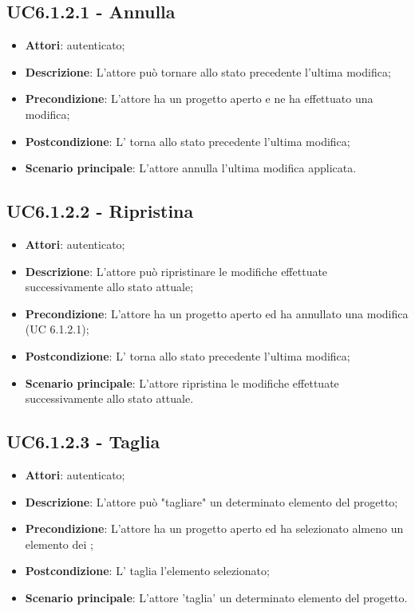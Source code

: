 \subsection{UC6.1.2.1 - Annulla}
\label{ssec:UC6.1.2.1}
\begin{itemize}
\item \textbf{Attori}:  autenticato;
\item \textbf{Descrizione}: L’attore può tornare allo stato precedente l’ultima modifica;
\item \textbf{Precondizione}: L'attore ha un progetto aperto e ne ha effettuato una modifica;
\item \textbf{Postcondizione}: L’ torna allo stato precedente l’ultima modifica;
\item \textbf{Scenario principale}: L'attore annulla l'ultima modifica applicata.
\end{itemize}
\subsection{UC6.1.2.2 - Ripristina}
\label{ssec:UC6.1.2.2}
\begin{itemize}
\item \textbf{Attori}:  autenticato;
\item \textbf{Descrizione}: L’attore può ripristinare le modifiche effettuate successivamente allo stato attuale;
\item \textbf{Precondizione}: L’attore ha un progetto aperto ed ha annullato una modifica (UC 6.1.2.1);
\item \textbf{Postcondizione}: L’ torna allo stato precedente l’ultima modifica;
\item \textbf{Scenario principale}: L'attore ripristina le modifiche effettuate successivamente allo stato attuale.
\end{itemize}
\subsection{UC6.1.2.3 - Taglia}
\label{ssec:UC6.1.2.3}
\begin{itemize}
\item \textbf{Attori}:  autenticato;
\item \textbf{Descrizione}: L’attore può "tagliare" un determinato elemento del progetto;
\item \textbf{Precondizione}: L’attore ha un progetto aperto ed ha selezionato almeno un elemento dei ;
\item \textbf{Postcondizione}: L’ taglia l’elemento selezionato;
\item \textbf{Scenario principale}: L'attore 'taglia' un determinato elemento del progetto.
\end{itemize}
